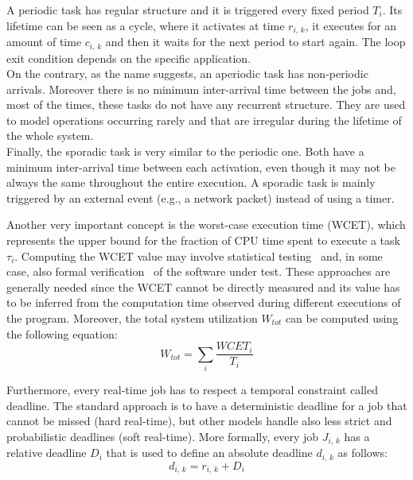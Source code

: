 A periodic task has regular structure
and it is triggered every fixed period \( T_{i} \). Its lifetime can be seen as
a cycle, where it activates at time \( r_{i,\,k} \), it executes for an amount 
of time \( c_{i,\,k} \) and then it waits for the next period to start again.
The loop exit condition depends on the specific application.\\
On the contrary, as the name suggests, an aperiodic task has non-periodic arrivals.
Moreover there is no minimum inter-arrival time between the jobs and,
most of the times, these tasks do not have any recurrent structure. They are used
to model operations occurring rarely and that are irregular during the lifetime
of the whole system.\\
Finally, the sporadic task is very similar to the periodic one. Both have a minimum
inter-arrival time between each activation, even though it may not be always the
same throughout the entire execution. A sporadic task is mainly triggered by an
external event (e.g., a network packet) instead of using a timer.

Another very important concept is the worst-case execution time (WCET), which
represents the upper bound for the fraction of CPU time spent to execute a task
\( \tau_{i} \). Computing the WCET value may involve statistical testing~\cite{bernat2002wcet}
and, in some case, also formal verification~\cite{souyris2009formal} of the
software under test. These approaches are generally needed since the WCET cannot
be directly measured and its value has to be inferred from the computation time
observed during different executions of the program.
Moreover, the total system utilization \( W_{tot} \) can be computed using
the following equation:
\begin{equation}\label{eq:system_utilization}
    W_{tot} = \displaystyle\sum_{i} \frac{WCET_i}{T_i}
\end{equation}

Furthermore, every real-time job has to respect a temporal constraint called
deadline. The standard approach is to have a deterministic deadline for a job
that cannot be missed (hard real-time), but other models handle also
less strict and probabilistic deadlines (soft real-time).
More formally, every job \( J_{i,\,k} \) has a relative deadline \( D_{i} \) that
is used to define an absolute deadline \( d_{i,\,k} \) as follows:
\begin{equation}
    d_{i,\,k} = r_{i,\,k} + D_{i}
\end{equation}

